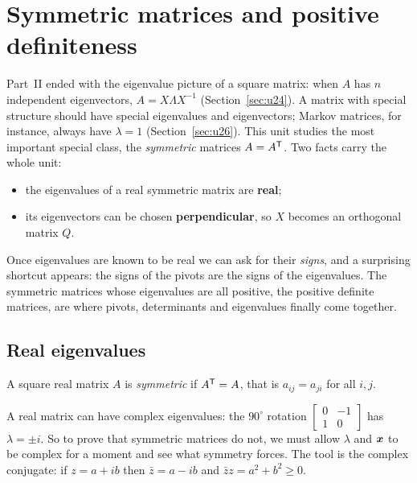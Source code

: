 \section{Symmetric matrices and positive definiteness}\label{sec:u29}

Part~II ended with the eigenvalue picture of a square matrix: when $A$ has $n$ independent
eigenvectors, $A=X\Lambda X^{-1}$ (Section~\ref{sec:u24}). A matrix with special structure should
have special eigenvalues and eigenvectors; Markov matrices, for instance, always have
$\lambda=1$ (Section~\ref{sec:u26}). This unit studies the most important special class,
the \emph{symmetric} matrices $A=A^{\mathsf{T}}$. Two facts carry the whole unit:
\begin{itemize}
  \item the eigenvalues of a real symmetric matrix are \textbf{real};
  \item its eigenvectors can be chosen \textbf{perpendicular}, so $X$ becomes an orthogonal matrix $Q$.
\end{itemize}
Once eigenvalues are known to be real we can ask for their \emph{signs}, and a surprising
shortcut appears: the signs of the pivots are the signs of the eigenvalues. The symmetric
matrices whose eigenvalues are all positive, the positive definite matrices, are where pivots,
determinants and eigenvalues finally come together.

\subsection{Real eigenvalues}

\begin{definition}\label{def:u29-symmetric}
A square real matrix $A$ is \emph{symmetric} if $A^{\mathsf{T}}=A$, that is $a_{ij}=a_{ji}$ for all $i,j$.
\end{definition}

A real matrix can have complex eigenvalues: the $90^\circ$ rotation
$\left[\begin{smallmatrix}0&-1\\1&0\end{smallmatrix}\right]$ has $\lambda=\pm i$. So to prove that
symmetric matrices do not, we must allow $\lambda$ and $\boldsymbol{x}$ to be complex for a moment
and see what symmetry forces. The tool is the complex conjugate: if $z=a+ib$ then
$\bar z=a-ib$ and $\bar z z=a^2+b^2\ge 0$.

